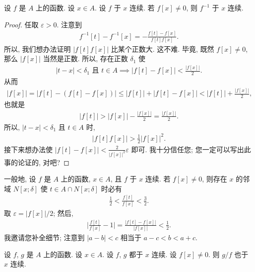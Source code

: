 \begin{theorem}
    设 $f$ 是 $A$ 上的函数.
    设 $x \in A$.
    设 $f$ 于 $x$ 连续.
    若 $f[x] \neq 0$, 则 $f^{-1}$ 于 $x$ 连续.
\end{theorem}

\begin{proof}
    任取 $\varepsilon > 0$.
    注意到
    \begin{align*}
        f^{-1} [t] - f^{-1} [x] = -\frac{f[t] - f[x]}{f[t] f[x]}.
    \end{align*}
    所以, 我们想办法证明 $|f[t] f[x]|$ 比某个正数大.
    这不难.
    毕竟, 既然 $f[x] \neq 0$, 那么 $|f[x]|$ 当然是正数.
    所以, 存在正数 $\delta_1$ 使
    \begin{align*}
        \text{$|t - x| < \delta_1$ 且 $t \in A$} \implies |f[t] - f[x]| < \frac{|f[x]|}{2}.
    \end{align*}
    从而
    \begin{align*}
        |f[x]| = |f[t] - (f[t] - f[x])| \leq |f[t]| + |f[t] - f[x]| < |f[t]| + \frac{|f[x]|}{2},
    \end{align*}
    也就是
    \begin{align*}
        |f[t]| > |f[x]| - \frac{|f[x]|}{2} = \frac{|f[x]|}{2}.
    \end{align*}
    所以, $|t - x| < \delta_1$ 且 $t \in A$ 时,
    \begin{align*}
        |f[t] f[x]| > \frac{1}{2} |f[x]|^2.
    \end{align*}
    接下来想办法使
    $|f[t] - f[x]| < \frac{2}{|f[x]|^2} \varepsilon$
    即可.
    我十分信任您;
    您一定可以写出此事的论证的, 对吧?
\end{proof}

\begin{remark}
    一般地,
    设 $f$ 是 $A$ 上的函数, $x \in A$, 且 $f$ 于 $x$ 连续.
    若 $f[x] \neq 0$, 则存在 $x$ 的邻域 $N[x; \delta]$
    使 $t \in A \cap N[x; \delta]$ 时必有
    \begin{align*}
        \frac{1}{2} < \frac{f[t]}{f[x]} < \frac{3}{2}.
    \end{align*}
    取 $\varepsilon = |f[x]|/2$; 然后,
    \begin{align*}
        \Bigg| \frac{f[t]}{f[x]} - 1 \Bigg| = \frac{|f[t] - f[x]|}{|f[x]|} < \frac{1}{2}.
    \end{align*}
    我邀请您补全细节;
    注意到 $|a - b| < c$ 相当于 $a - c < b < a + c$.
\end{remark}

\begin{theorem}
    设 $f$, $g$ 是 $A$ 上的函数.
    设 $x \in A$.
    设 $f$, $g$ 都于 $x$ 连续.
    设 $f[x] \neq 0$.
    则 $g/f$ 也于 $x$ 连续.
\end{theorem}

